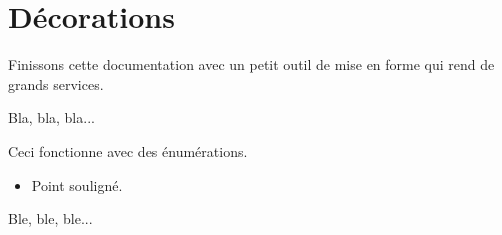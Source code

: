 \documentclass[10pt, a4paper]{../main/main}
\begin{document}
\section{Décorations}

Finissons cette documentation avec un petit outil de mise en forme qui rend de grands services.


\begin{tdoclatex}[sbs]
Bla, bla, bla...

\tdocsep %

Ceci fonctionne avec des énumérations.

\begin{itemize}
    \item Point souligné.
\end{itemize}

\tdocsep %

Ble, ble, ble...
\end{tdoclatex}
\end{document}
